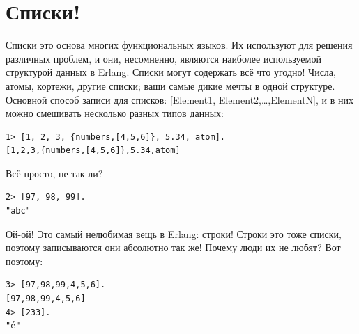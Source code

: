 \documentclass[a4paper,12pt]{report}
\newcommand{\ops}{\colorbox{lgreen}}
\begin{document}
\section{Списки!}
\label{lists}
Списки это основа многих функциональных языков. Их используют для решения различных проблем, и они, несомненно, являются наиболее используемой структурой данных в Erlang. Списки могут содержать всё что угодно! Числа, атомы, кортежи, другие списки; ваши самые дикие мечты в одной структуре. Основной способ записи для списков: \ops{[Element1, Element2,\ldots,ElementN]}, и в них можно смешивать несколько разных типов данных:
\begin{lstlisting}[style=repl]
1> [1, 2, 3, {numbers,[4,5,6]}, 5.34, atom].
[1,2,3,{numbers,[4,5,6]},5.34,atom]
\end{lstlisting}

Всё просто, не так ли?
\begin{lstlisting}[style=repl]
2> [97, 98, 99].
"abc"
\end{lstlisting}

Ой\--ой! Это самый нелюбимая вещь в Erlang: строки! Строки это тоже списки, поэтому записываются они абсолютно так же! Почему люди их не любят? Вот поэтому:
\begin{lstlisting}[style=repl]
3> [97,98,99,4,5,6].
[97,98,99,4,5,6]
4> [233].
"é"
\end{lstlisting}
\end{document}
